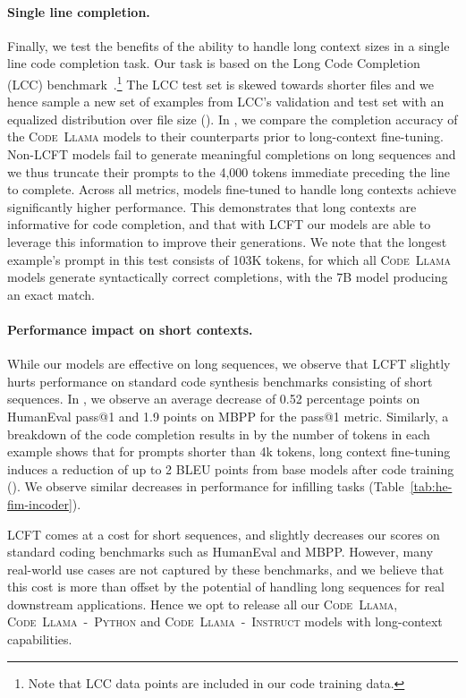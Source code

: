 \documentclass[10pt]{article}
\newcommand{\model}{\textsc{Code~Llama}\xspace}
\newcommand{\instmodel}{\textsc{Code~Llama~-~Instruct}\xspace}
\newcommand{\pymodel}{\textsc{Code~Llama~-~Python}\xspace}
\begin{document}
\paragraph{Single line completion.} Finally, we test the benefits of the ability to handle long context sizes in a single line code completion task.
Our task is based on the Long Code Completion (LCC) benchmark~\citep{guo2023longcoder}.\footnote{Note that LCC data points are included in our code training data.}
The LCC test set is skewed towards shorter files and we hence sample a new set of examples from LCC's validation and test set with an equalized distribution over file size ().
In , we compare the completion accuracy of the \model models to their counterparts prior to long-context fine-tuning.
Non-LCFT models fail to generate meaningful completions on long sequences and we thus truncate their prompts to the 4,000 tokens immediate preceding the line to complete.
Across all metrics, models fine-tuned to handle long contexts achieve significantly higher performance.
This demonstrates that long contexts are informative for code completion, and that with LCFT our models are able to leverage this information to improve their generations. 
We note that the longest example's prompt in this test consists of 103K tokens, for which all \model models generate syntactically correct completions, with the 7B model producing an exact match.

\paragraph{Performance impact on short contexts.}
While our models are effective on long sequences, we observe that LCFT slightly hurts performance on standard code synthesis benchmarks consisting of short sequences.
In , we observe an average decrease of 0.52 percentage points on HumanEval pass@1 and 1.9 points on MBPP for the pass@1 metric.
Similarly, a breakdown of the code completion results in  by the number of tokens in each example shows that for prompts shorter than 4k tokens, long context fine-tuning induces a reduction of up to 2 BLEU points from base models after code training ().
We observe similar decreases in performance for infilling tasks (Table~\ref{tab:he-fim-incoder}).

LCFT comes at a cost for short sequences, and slightly decreases our scores on standard coding benchmarks such as HumanEval and MBPP. However, many real-world use cases are not captured by these benchmarks, and we believe that this cost is more than offset by the potential of handling long sequences for real downstream applications. Hence we opt to release all our \model, \pymodel and \instmodel models with long-context capabilities.
\end{document}
